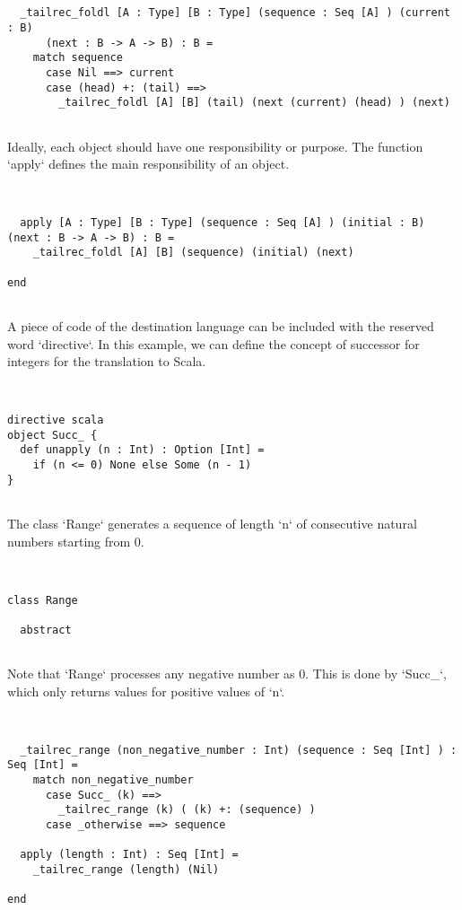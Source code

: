 \documentclass[12pt,a4paper]{article}
\begin{document}
\begin{lstlisting}


  _tailrec_foldl [A : Type] [B : Type] (sequence : Seq [A] ) (current : B)
      (next : B -> A -> B) : B =
    match sequence
      case Nil ==> current
      case (head) +: (tail) ==>
        _tailrec_foldl [A] [B] (tail) (next (current) (head) ) (next)


\end{lstlisting}

  Ideally, each object should have one responsibility or purpose. The function `apply`
   defines the main responsibility of an object.


\begin{lstlisting}


  apply [A : Type] [B : Type] (sequence : Seq [A] ) (initial : B) (next : B -> A -> B) : B =
    _tailrec_foldl [A] [B] (sequence) (initial) (next)

end


\end{lstlisting}

A piece of code of the destination language can be included with the reserved word
 `directive`. In this example, we can define the concept of successor for integers for the
 translation to Scala.


\begin{lstlisting}


directive scala
object Succ_ {
  def unapply (n : Int) : Option [Int] =
    if (n <= 0) None else Some (n - 1)
}


\end{lstlisting}

The class `Range` generates a sequence of length `n` of consecutive natural numbers starting
 from 0.


\begin{lstlisting}


class Range

  abstract


\end{lstlisting}

  Note that `Range` processes any negative number as 0. This is done by `Succ_`, which only
   returns values for positive values of `n`.


\begin{lstlisting}


  _tailrec_range (non_negative_number : Int) (sequence : Seq [Int] ) : Seq [Int] =
    match non_negative_number
      case Succ_ (k) ==>
        _tailrec_range (k) ( (k) +: (sequence) )
      case _otherwise ==> sequence

  apply (length : Int) : Seq [Int] =
    _tailrec_range (length) (Nil)

end


\end{lstlisting}
\end{document}
